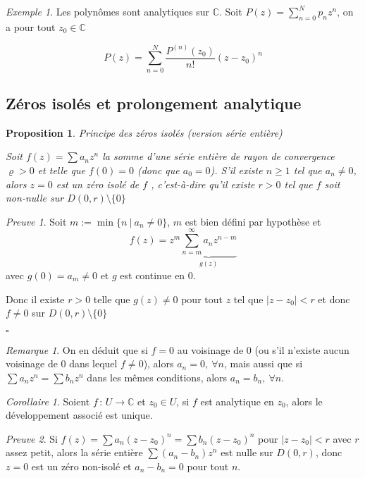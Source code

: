 \documentclass[]{article}
\newtheorem{myproposition}{Proposition}
\theoremstyle{remark}
\newtheorem{myrem}{Remarque}
\newtheorem{myproof}{Preuve}
\newtheorem{myexmpl}{Exemple}
\newtheorem{mycor}{Corollaire}
\theoremstyle{definition}
\newcommand{\cqfd}{
	\hfill$\square$
}
\newcommand{\funcshort}[3]{
	#1 \, : \, #2 \longrightarrow #3
}
\begin{document}
\begin{myexmpl}
	Les polynômes sont analytiques sur $\mathbb{C}$. Soit $\displaystyle P(z) = \sum_{n = 0}^{N} p_n z^n$, on a pour tout $z_0 \in \mathbb{C}$
	
	$$P(z) = \sum_{n = 0}^{N} \frac{P^{(n)}(z_0)}{n!} (z - z_0)^n$$
\end{myexmpl}

\subsection{Zéros isolés et prolongement analytique}

\begin{myproposition} Principe des zéros isolés (version série entière)
	
	Soit $f(z) = \sum a_n z^n$ la somme d'une série entière de rayon de convergence $\varrho > 0$ et telle que $f(0) = 0$ (donc que $a_0 = 0$).
	S'il existe $n \geqslant 1$ tel que $a_n \neq 0$, alors $z = 0$ est un \textit{zéro isolé} de $f$ , c'est-à-dire qu'il existe $r > 0$ tel que $f$ soit non-nulle sur $D(0, r) \setminus \{0\}$
\end{myproposition}

\begin{myproof}
	Soit $m := \min \{n ~ | ~ a_n \neq 0\}$, $m$ est bien défini par hypothèse et $$f(z) = z^m \underbrace{\sum_{n = m}^{\infty} a_n z^{n - m}}_{g(z)}$$ avec $g(0) = a_m \neq 0$ et $g$ est continue en 0.
	
	Donc il existe $r > 0$ telle que $g(z) \neq 0$ pour tout $z$ tel que $|z - z_0| < r$ et donc $f \neq 0$ sur $D(0, r) \setminus \{0\}$
	
	\cqfd	
\end{myproof}

\begin{myrem}
	On en déduit que si $f = 0$ au voisinage de 0 (ou s'il n'existe aucun voisinage de 0 dans lequel $f \neq 0$), alors $a_n = 0, ~ \forall n$, mais aussi que si $\sum a_n z^n = \sum b_n z^n$ dans les mêmes conditions, alors $a_n = b_n, ~ \forall n$.
\end{myrem}

\begin{mycor}
	Soient $\funcshort{f}{U}{\mathbb{C}}$ et $z_0 \in U$, si $f$ est analytique en $z_0$, alors le développement associé est unique.
\end{mycor}

\begin{myproof}
	Si $f(z) = \sum a_n(z - z_0)^n = \sum b_n(z - z_0)^n$ pour $|z - z_0| < r$ avec $r$ assez petit, alors la série entière $\sum(a_n - b_n)z^n$ est nulle sur $D(0, r)$, donc $z = 0$ est un zéro non-isolé et $a_n - b_n = 0$ pour tout $n$.
\end{myproof}
\end{document}
